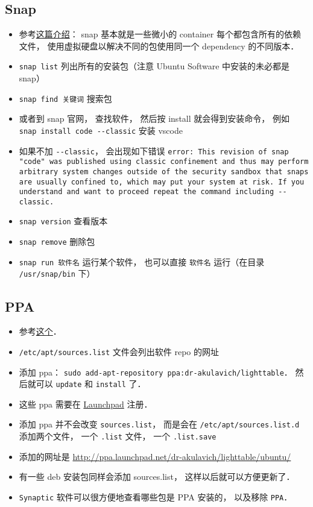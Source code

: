 \subsection{Snap}
\begin{itemize}
\item 参考\href{https://www.howtogeek.com/660193/how-to-work-with-snap-packages-on-linux/}{这篇介绍}： snap 基本就是一些微小的 container 每个都包含所有的依赖文件， 使用虚拟硬盘以解决不同的包使用同一个 dependency 的不同版本．
\item \verb|snap list| 列出所有的安装包（注意 Ubuntu Software 中安装的未必都是 snap）
\item \verb|snap find 关键词| 搜索包
\item 或者到 snap 官网， 查找软件， 然后按 install 就会得到安装命令， 例如 \verb|snap install code --classic| 安装 vscode
\item 如果不加 \verb|--classic|， 会出现如下错误 \verb|error: This revision of snap "code" was published using classic confinement and thus may perform arbitrary system changes outside of the security sandbox that snaps are usually confined to, which may put your system at risk. If you understand and want to proceed repeat the command including --classic.|
\item \verb|snap version| 查看版本
\item \verb|snap remove| 删除包
\item \verb|snap run 软件名| 运行某个软件， 也可以直接 \verb|软件名| 运行（在目录 \verb|/usr/snap/bin| 下）
\end{itemize}

\subsection{PPA}
\begin{itemize}
\item 参考\href{https://itsfoss.com/ppa-guide/}{这个}．
\item \verb|/etc/apt/sources.list| 文件会列出软件 repo 的网址
\item 添加 ppa： \verb|sudo add-apt-repository ppa:dr-akulavich/lighttable|． 然后就可以 \verb|update| 和 \verb|install| 了．
\item 这些 ppa 需要在 \href{https://launchpad.net/}{Launchpad} 注册．
\item 添加 ppa 并不会改变 \verb|sources.list|， 而是会在 \verb|/etc/apt/sources.list.d| 添加两个文件， 一个 \verb|.list| 文件， 一个 \verb|.list.save|
\item 添加的网址是 \href{http://ppa.launchpad.net/dr-akulavich/lighttable/ubuntu/}{http://ppa.launchpad.net/dr-akulavich/lighttable/ubuntu/}
\item 有一些 deb 安装包同样会添加 sources.list， 这样以后就可以方便更新了．
\item \verb|Synaptic| 软件可以很方便地查看哪些包是 PPA 安装的， 以及移除 \verb|PPA|．
\end{itemize}
